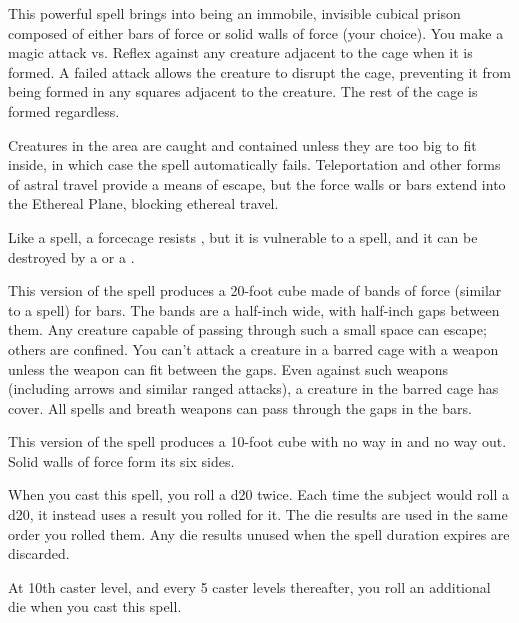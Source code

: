 \spellrng{\rngmed}
\spelldur{\durlong \dismissable}
\spelleffect This powerful spell brings into being an immobile, invisible cubical prison composed of either bars of force or solid walls of force (your choice). You make a magic attack vs. Reflex against any creature adjacent to the cage when it is formed. A failed attack allows the creature to disrupt the cage, preventing it from being formed in any squares adjacent to the creature. The rest of the cage is formed regardless.
\par Creatures in the area are caught and contained unless they are too big to fit inside, in which case the spell automatically fails. Teleportation and other forms of astral travel provide a means of escape, but the force walls or bars extend into the Ethereal Plane, blocking ethereal travel.
\par Like a  spell, a forcecage resists , but it is vulnerable to a  spell, and it can be destroyed by a  or a .
\par {} This version of the spell produces a 20-foot cube made of bands of force (similar to a  spell) for bars. The bands are a half-inch wide, with half-inch gaps between them. Any creature capable of passing through such a small space can escape; others are confined. You can't attack a creature in a barred cage with a weapon unless the weapon can fit between the gaps. Even against such weapons (including arrows and similar ranged attacks), a creature in the barred cage has cover. All spells and breath weapons can pass through the gaps in the bars.
\par {} This version of the spell produces a 10-foot cube with no way in and no way out. Solid walls of force form its six sides.

\spelldur{\durshort}
\spelleffect When you cast this spell, you roll a d20 twice. Each time the subject would roll a d20, it instead uses a result you rolled for it. The die results are used in the same order you rolled them. Any die results unused when the spell duration expires are discarded.

At 10th caster level, and every 5 caster levels thereafter, you roll an additional die when you cast this spell.

